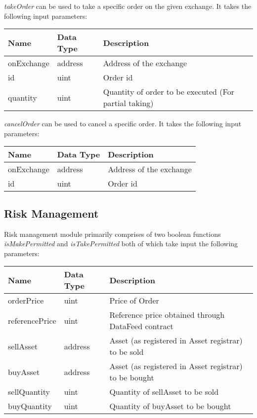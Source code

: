 \documentclass[conference]{IEEEtran}
\begin{document}
\textit{takeOrder} can be used to take a specific order on the given exchange. It takes the following input parameters:
\begin{center}
	\footnotesize
	\begin{tabular}{ | p{2.7cm} | p{0.8cm} | p{4cm} | }
		\hline
		Name & Data Type & Description \\ \hline
		onExchange & address & Address of the exchange \\ \hline
		id & uint & Order id \\ \hline
		quantity & uint & Quantity of order to be executed (For partial taking) \\ \hline
	\end{tabular}
\end{center}

\textit{cancelOrder} can be used to cancel a specific order. It takes the following input parameters:
\begin{center}
	\footnotesize
	\begin{tabular}{ | p{2.7cm} | p{0.8cm} | p{4cm} | }
		\hline
		Name & Data Type & Description \\ \hline
		onExchange & address & Address of the exchange \\ \hline
		id & uint & Order id \\ \hline
	\end{tabular}
\end{center}

\subsection{Risk Management}

Risk management module primarily comprises of two boolean functions \textit{isMakePermitted} and \textit{isTakePermitted} both of which take input the following parameters:

\begin{center}
	\footnotesize
	\begin{tabular}{ | p{2.7cm} | p{0.8cm} | p{4cm} | }
		\hline
		Name & Data Type & Description \\ \hline
		orderPrice & uint & Price of Order \\ \hline
		referencePrice & uint &  Reference price obtained through DataFeed contract \\ \hline
		sellAsset & address & Asset (as registered in Asset registrar) to be sold \\ \hline
		buyAsset & address & Asset (as registered in Asset registrar) to be bought \\ \hline
		sellQuantity & uint & Quantity of sellAsset to be sold \\ \hline
		buyQuantity & uint & Quantity of buyAsset to be bought \\ \hline
	\end{tabular}
\end{center}
\end{document}
